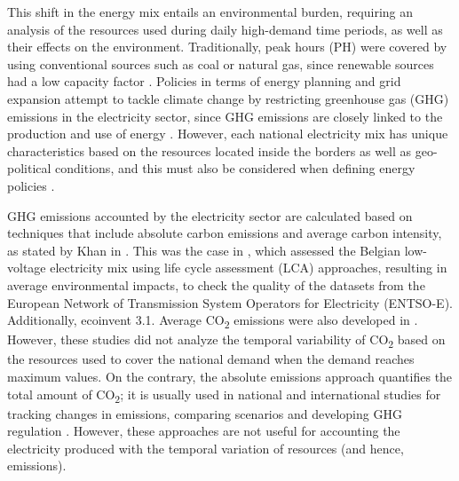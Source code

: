 This shift in the energy mix entails an environmental burden, requiring an analysis of the resources used during  daily high-demand time periods, as well as their effects on the environment. Traditionally, peak hours (PH) were covered by using conventional sources such as coal or natural gas, since renewable sources had a low capacity factor \cite{NEVES2018905}. Policies in terms of energy planning and grid expansion attempt to tackle  climate change by restricting greenhouse gas (GHG) emissions in the electricity sector, since GHG emissions are closely linked to the production and use of energy \cite{Sinn2008PublicApproach}. However, each national electricity mix has unique characteristics based on the resources located inside the borders as well as geo-political conditions, and this must also be considered when defining energy policies \cite{Murdock2018, DAHAL2018222, LEVIN201953, BEST2018404, ZHAO2018303, SIMOES2017353}. 

{GHG emissions accounted by the electricity sector are calculated based on techniques that include absolute carbon emissions and average carbon intensity, as stated by Khan in \cite{Khan2019CarbonIntensity}. This was the case in \cite{Buyle2019}, which assessed the Belgian low-voltage electricity mix using life cycle assessment (LCA) approaches, resulting in average environmental impacts, to check the quality of the datasets from the European Network of Transmission System Operators for Electricity (ENTSO-E). Additionally, ecoinvent 3.1. Average CO\textsubscript2 emissions were also developed in \cite{Jones2017AnGeneration, PATTUPARA2016152}. However, these studies did not analyze the temporal variability of CO\textsubscript2 based on the resources used to cover the national demand when the demand reaches maximum values. On the contrary, the absolute emissions approach quantifies the total amount of CO\textsubscript2; it is usually used in national and international studies for tracking changes in emissions, comparing scenarios and developing GHG regulation \cite{IEA2018electricity, eun2016does, Richeson2019, ZHANG2013159}. However, these approaches are not useful for accounting the electricity produced with the temporal variation of resources (and hence, emissions).}

